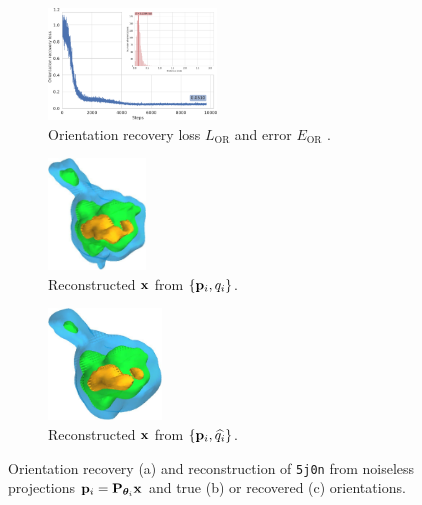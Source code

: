 \begin{figure}[t]
    \centering
    \begin{subfigure}[b]{0.42\textwidth}
        \centering
        \includegraphics[width=\linewidth,height=8em]{figures/5j0n_noise0_ar_aa}
        \caption{%
            Orientation recovery loss $L_\text{OR}$  and error $E_\text{OR}$ .
        }\label{fig:5j0n-noise0-orientation-recovery}
    \end{subfigure}
    \hfill
    \begin{subfigure}[b]{0.27\linewidth}
        \centering
        \includegraphics[height=8em]{figures/5j0n_reconstruction_GT}
        \caption{Reconstructed $\mathbf{x}$ from $\{ \mathbf{p}_i, q_i \}$.}
    \end{subfigure}
    \hfill
    \begin{subfigure}[b]{0.27\linewidth}
        \centering
        \includegraphics[height=8em]{figures/5j0n_reconstruction_noise0}
        \caption{Reconstructed $\mathbf{x}$ from $\{ \mathbf{p}_i, \widehat{q_i} \}$.}
    \end{subfigure}
    \caption{%
        Orientation recovery (a) and reconstruction of \texttt{5j0n} from noiseless projections $\mathbf{p}_i = \mathbf{P}_{{\boldsymbol{\theta}}_i} \mathbf{x}$ and true (b) or recovered (c) orientations.
    }\label{fig:5j0n-noise0-reconstruction}
\end{figure}

